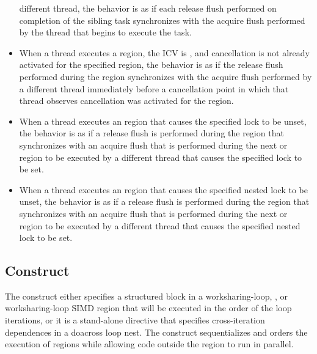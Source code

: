 \begin{itemize}
      different thread, the behavior is as if each release flush performed
      on completion of the sibling task synchronizes with the acquire flush
      performed by the thread that begins to execute the task.
\item When a thread executes a  region, the 
      ICV is , and cancellation is not already activated for the
      specified region, the behavior is as if the release flush performed
      during the  region synchronizes with the acquire flush
      performed by a different thread immediately before a cancellation
      point in which that thread observes cancellation was activated for the region.
\item When a thread executes an  region that causes the
      specified lock to be unset, the behavior is as if a release flush is
      performed during the  region that synchronizes
      with an acquire flush that is performed during the next
       or  region to be executed by a
      different thread that causes the specified lock to be set.
\item When a thread executes an  region that causes
      the specified nested lock to be unset, the behavior is as if a release flush
      is performed during the  region that
      synchronizes with an acquire flush that is performed during the next
       or  region to be
      executed by a different thread that causes the specified nested lock to be set.  
\end{itemize}



\subsection{ Construct}
\label{subsec:ordered Construct}
\summary
The  construct either specifies a structured block in a
worksharing-loop, , or worksharing-loop SIMD region that will 
be executed in the order of the loop iterations, or it is a stand-alone 
directive that specifies cross-iteration dependences in a doacross loop 
nest. The  construct sequentializes and orders the execution 
of  regions while allowing code outside the region to run in parallel.

